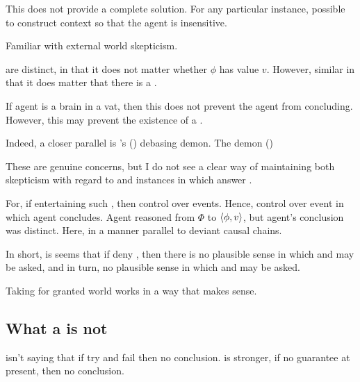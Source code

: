\begin{note}
  This does not provide a complete solution.
  For any particular instance, possible to construct context so that the agent is insensitive.

  Familiar with external world skepticism.

   are distinct, in that it does not matter whether \(\phi\) has value \(v\).
  However, similar in that it does matter that there is a \pevent{}.

  If agent is a brain in a vat, then this does not prevent the agent from concluding.
  However, this may prevent the existence of a \pevent{}.

  Indeed, a closer parallel is \citeauthor{Schaffer:2010vq}'s (\citeyear{Schaffer:2010vq}) debasing demon.
  The demon  (\citeyear[231]{Schaffer:2010vq})
\end{note}

\begin{note}
  These are genuine concerns, but I do not see a clear way of maintaining both skepticism with regard to  and instances in which \ros{} answer \qWhyV{}.

  For, if entertaining such , then control over events.
  Hence, control over event in which agent concludes.
  Agent reasoned from \(\Phi\) to \(\langle \phi, v \rangle\), but agent's conclusion was distinct.
  Here, in a manner parallel to deviant causal chains.
\end{note}

\begin{note}
  In short, is seems that if deny , then  there is no plausible sense in which \qWhy{} and \qHow{} may be asked, and in turn, no plausible sense in which \qWhyV{} and \qHowV{} may be asked.

  Taking for granted world works in a way that makes sense.
\end{note}

\subsection{What a \requ{} is not}

\begin{note}
  \requ{} isn't saying that if try and fail then no conclusion.
  \requ{} is stronger, if no guarantee at present, then no conclusion.
\end{note}

